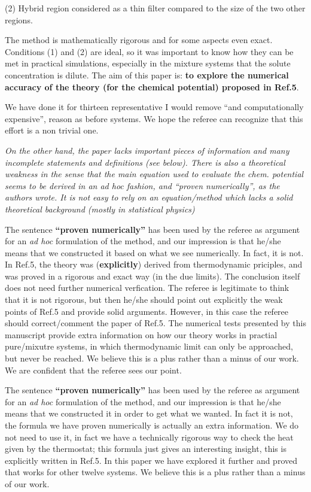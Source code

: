 \documentclass[12pt]{article}
\newcommand{\recheck}[1]{{\color{red} #1}}
\begin{document}
(2) Hybrid region considered as a thin filter compared to the size of
the two other regions.

The method is mathematically rigorous and for some aspects even
exact. Conditions (1) and (2) are ideal, so it was important to know
how they can be met in \recheck{practical simulations, especially in
the mixture systems that the solute concentration is dilute.} The aim of this
paper is: {\bf to explore the numerical accuracy of the theory (for
  the chemical potential) proposed in Ref.5}.

We have done it for thirteen representative \recheck{I would remove ``and computationally expensive'', reason as before} systems.
We hope the referee can recognize that this effort is a non trivial one.


{\it On the other hand, the paper lacks important pieces of information and many incomplete statements and definitions (see below). There is also a theoretical
weakness in the sense that the main equation used to evaluate the chem. potential seems to be derived in an ad hoc fashion, and ``proven numerically'', as the authors wrote. It is not easy to rely on an equation/method which lacks a solid theoretical background (mostly in statistical physics)}

The sentence {\bf ``proven numerically''} has been used by the referee
as argument for an {\it ad hoc} formulation of the method, and our
impression is that he/she means that we constructed it based on
\recheck{what we see numerically}. \recheck{ In fact, it is not. In
  Ref.5, the theory was ({\bf explicitly}) derived from thermodynamic
  priciples, and was proved in a rigorous and exact way (in the due
  limits). The conclusion itself does not need further numerical verfication.
  The referee is legitimate to think that it is not rigorous, but
  then he/she should point out explicitly the weak points of Ref.5 and
  provide solid arguments.  However, in this case the referee should 
  correct/comment the paper of Ref.5. The numerical tests
  presented by this manuscript provide extra information on how our
  theory works in practial pure/mixutre systems, in which
  thermodynamic limit can only be approached, but never be reached. We believe this is a plus
  rather than a minus of our work. We are confident that the referee
  sees our point.
}

The sentence {\bf ``proven numerically''} has been used by the referee
as argument for an {\it ad hoc} formulation of the method, and our
impression is that he/she means that we constructed it in order to get
what we wanted. In fact it is not, the formula we have proven
numerically is actually an extra information. We do not need to use
it, in fact we have a technically rigorous way to check the heat given
by the thermostat; this formula just gives an interesting insight,
this is explicitly written in Ref.5. In this paper we have explored it
further and proved that works for other twelve systems. We believe
this is a plus rather than a minus of our work.
\end{document}
